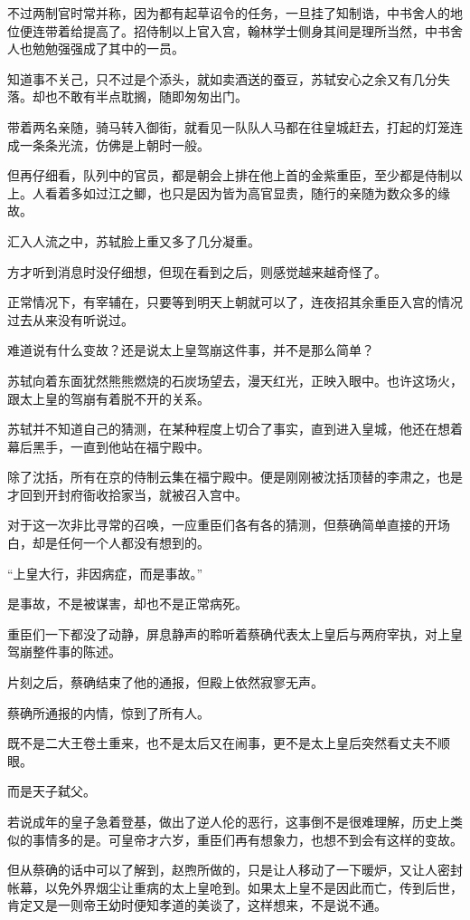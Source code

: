 不过两制官时常并称，因为都有起草诏令的任务，一旦挂了知制诰，中书舍人的地位便连带着给提高了。招侍制以上官入宫，翰林学士侧身其间是理所当然，中书舍人也勉勉强强成了其中的一员。

知道事不关己，只不过是个添头，就如卖酒送的蚕豆，苏轼安心之余又有几分失落。却也不敢有半点耽搁，随即匆匆出门。

带着两名亲随，骑马转入御街，就看见一队队人马都在往皇城赶去，打起的灯笼连成一条条光流，仿佛是上朝时一般。

但再仔细看，队列中的官员，都是朝会上排在他上首的金紫重臣，至少都是侍制以上。人看着多如过江之鲫，也只是因为皆为高官显贵，随行的亲随为数众多的缘故。

汇入人流之中，苏轼脸上重又多了几分凝重。

方才听到消息时没仔细想，但现在看到之后，则感觉越来越奇怪了。

正常情况下，有宰辅在，只要等到明天上朝就可以了，连夜招其余重臣入宫的情况过去从来没有听说过。

难道说有什么变故？还是说太上皇驾崩这件事，并不是那么简单？

苏轼向着东面犹然熊熊燃烧的石炭场望去，漫天红光，正映入眼中。也许这场火，跟太上皇的驾崩有着脱不开的关系。

苏轼并不知道自己的猜测，在某种程度上切合了事实，直到进入皇城，他还在想着幕后黑手，一直到他站在福宁殿中。

除了沈括，所有在京的侍制云集在福宁殿中。便是刚刚被沈括顶替的李肃之，也是才回到开封府衙收拾家当，就被召入宫中。

对于这一次非比寻常的召唤，一应重臣们各有各的猜测，但蔡确简单直接的开场白，却是任何一个人都没有想到的。

“上皇大行，非因病症，而是事故。”

是事故，不是被谋害，却也不是正常病死。

重臣们一下都没了动静，屏息静声的聆听着蔡确代表太上皇后与两府宰执，对上皇驾崩整件事的陈述。

片刻之后，蔡确结束了他的通报，但殿上依然寂寥无声。

蔡确所通报的内情，惊到了所有人。

既不是二大王卷土重来，也不是太后又在闹事，更不是太上皇后突然看丈夫不顺眼。

而是天子弑父。

若说成年的皇子急着登基，做出了逆人伦的恶行，这事倒不是很难理解，历史上类似的事情多的是。可皇帝才六岁，重臣们再有想象力，也想不到会有这样的变故。

但从蔡确的话中可以了解到，赵煦所做的，只是让人移动了一下暖炉，又让人密封帐幕，以免外界烟尘让重病的太上皇呛到。如果太上皇不是因此而亡，传到后世，肯定又是一则帝王幼时便知孝道的美谈了，这样想来，不是说不通。

